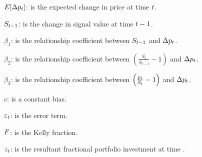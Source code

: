\documentclass{article}
\begin{document}
$E[\Delta p_{t}]$: is the expected change in price at time $t$.

$S_{t-1}$: is the change in signal value at time $t-1$.

$\beta_{1}$: is the relationship coefficient between $S_{t-1}$ and $\Delta p_{t}$.

$\beta_{2}$: is the relationship coefficient between $\left(\frac{S_t}{S_{t-1}}-1\right)$ and $\Delta p_{t}$.

$\beta_{3}$: is the relationship coefficient between $\left(\frac{p_t}{S_t}-1\right)$ and $\Delta p_{t}$.

$c$: is a constant bias.

$\varepsilon_{t}$: is the error term.

$F$: is the Kelly fraction.

$z_{t}$: is the resultant fractional portfolio investment at time \currenttime.


\keyterms
\furtherlinks %
\end{document}
